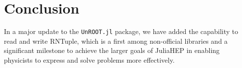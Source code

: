 \documentclass{juliacon}
\begin{document}
\section{Conclusion}
In a major update to the \verb|UnROOT.jl| package, we have added the capability to read and write
RNTuple, which is a first among non-official libraries and a significant milestone to achieve the
larger goals of JuliaHEP in enabling physicists to express and solve problems more effectively.


\end{document}
